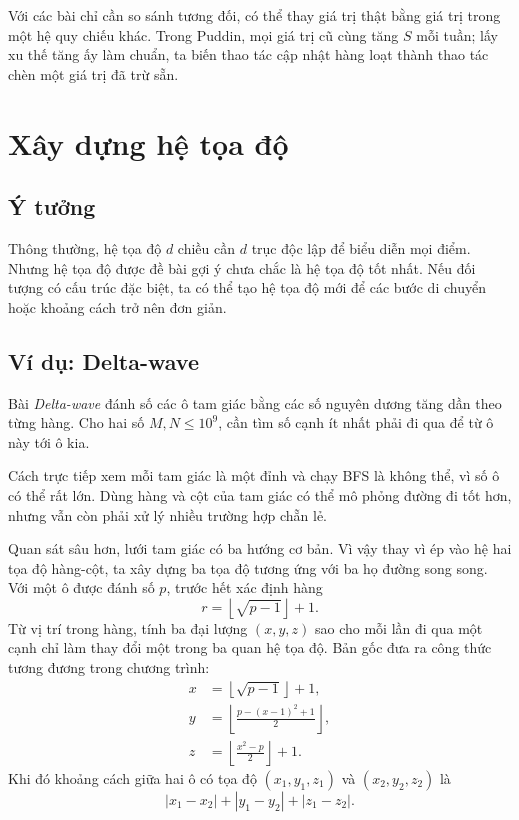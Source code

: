 \documentclass[11pt]{article}
\begin{document}
Với các bài chỉ cần so sánh tương đối, có thể thay giá trị thật bằng giá trị
trong một hệ quy chiếu khác. Trong Puddin, mọi giá trị cũ cùng tăng \(S\) mỗi
tuần; lấy xu thế tăng ấy làm chuẩn, ta biến thao tác cập nhật hàng loạt thành
thao tác chèn một giá trị đã trừ sẵn.

\section{Xây dựng hệ tọa độ}

\subsection{Ý tưởng}

Thông thường, hệ tọa độ \(d\) chiều cần \(d\) trục độc lập để biểu diễn mọi
điểm. Nhưng hệ tọa độ được đề bài gợi ý chưa chắc là hệ tọa độ tốt nhất. Nếu
đối tượng có cấu trúc đặc biệt, ta có thể tạo hệ tọa độ mới để các bước di
chuyển hoặc khoảng cách trở nên đơn giản.

\subsection{Ví dụ: Delta-wave}

Bài \textit{Delta-wave} đánh số các ô tam giác bằng các số nguyên dương tăng
dần theo từng hàng. Cho hai số \(M,N\le10^9\), cần tìm số cạnh ít nhất phải
đi qua để từ ô này tới ô kia.

Cách trực tiếp xem mỗi tam giác là một đỉnh và chạy BFS là không thể, vì số ô
có thể rất lớn. Dùng hàng và cột của tam giác có thể mô phỏng đường đi tốt
hơn, nhưng vẫn còn phải xử lý nhiều trường hợp chẵn lẻ.

Quan sát sâu hơn, lưới tam giác có ba hướng cơ bản. Vì vậy thay vì ép vào hệ
hai tọa độ hàng-cột, ta xây dựng ba tọa độ tương ứng với ba họ đường song
song. Với một ô được đánh số \(p\), trước hết xác định hàng
\[
  r=\left\lfloor\sqrt{p-1}\right\rfloor+1.
\]
Từ vị trí trong hàng, tính ba đại lượng \((x,y,z)\) sao cho mỗi lần đi qua
một cạnh chỉ làm thay đổi một trong ba quan hệ tọa độ. Bản gốc đưa ra công
thức tương đương trong chương trình:
\[
\begin{aligned}
  x&=\left\lfloor\sqrt{p-1}\right\rfloor+1,\\
  y&=\left\lfloor\frac{p-(x-1)^2+1}{2}\right\rfloor,\\
  z&=\left\lfloor\frac{x^2-p}{2}\right\rfloor+1.
\end{aligned}
\]
Khi đó khoảng cách giữa hai ô có tọa độ \((x_1,y_1,z_1)\) và
\((x_2,y_2,z_2)\) là
\[
  |x_1-x_2|+|y_1-y_2|+|z_1-z_2|.
\]
\end{document}
